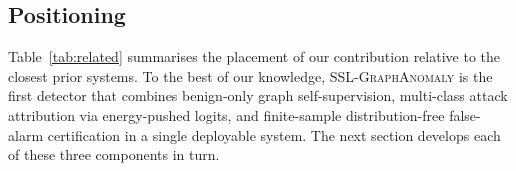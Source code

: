 \documentclass{ieeeaccess}
\begin{document}
\subsection{Positioning}
Table~\ref{tab:related} summarises the placement of our contribution
relative to the closest prior systems. To the best of our knowledge,
\textsc{SSL-GraphAnomaly} is the first detector that combines benign-only
graph self-supervision, multi-class attack attribution via energy-pushed
logits, and finite-sample distribution-free false-alarm certification in a
single deployable system. The next section develops each of these three
components in turn.

\begin{table}[!t]
\centering
\caption{Positioning of \textsc{SSL-GraphAnomaly} against closest prior
systems. ``Graph'' indicates an edge-featured graph encoder; ``Unsup.''
indicates training without labelled attack data; ``Attr.''~indicates
multi-class attack-type attribution; ``Cert.''~indicates a finite-sample
distribution-free coverage guarantee on the false-alarm rate.}
\label{tab:related}
\footnotesize
\setlength{\tabcolsep}{3pt}
\end{table}
\end{document}
